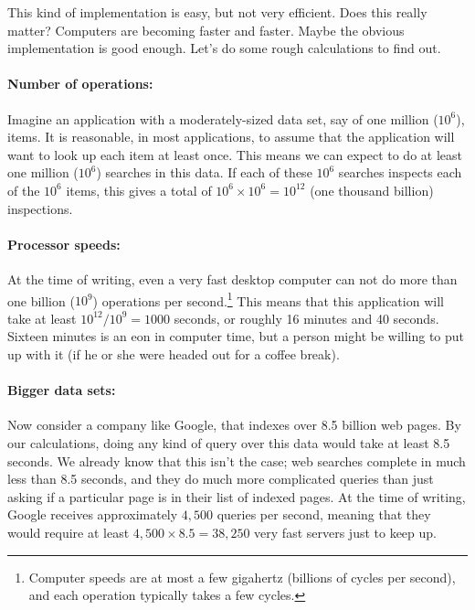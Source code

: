 This kind of implementation is easy, but not very efficient.  Does this really matter?  Computers are becoming faster and faster. Maybe the obvious implementation is good enough. Let's do some rough calculations to find out.

\paragraph{Number of operations:}  Imagine an application with a moderately-sized data set, say of one million ($10^6$), items.  It is reasonable, in most applications, to assume that the application will want to look up each item at least once.  This means we can expect to do at least one million ($10^6$) searches in this data.  If each of these $10^6$ searches inspects  each of the $10^6$ items, this gives a total of $10^6\times 10^6=10^{12}$ (one thousand billion) inspections.

\paragraph{Processor speeds:} At the time of writing, even a very fast desktop computer can not do more than one billion ($10^9$) operations per second.\footnote{Computer speeds are at most a few gigahertz (billions of cycles per second), and each operation typically takes a few cycles.} This means that this application will take at least $10^{12}/10^9 = 1000$ seconds, or roughly 16 minutes and 40 seconds.  Sixteen minutes is an eon in computer time, but a person might be willing to put up with it (if he or she were headed out for a coffee break).


\paragraph{Bigger data sets:} Now consider a company like Google,  that indexes over 8.5 billion web pages.  By our calculations, doing any kind of query over this data would take at least 8.5 seconds.  We already know that this isn't the case; web searches complete in much less than 8.5 seconds, and they do much more complicated queries than just asking if a particular page is in their list of indexed pages.  At the time of writing, Google receives approximately $4,500$ queries per second, meaning that they would require at least $4,500\times 8.5=38,250$ very fast servers just to keep up.

